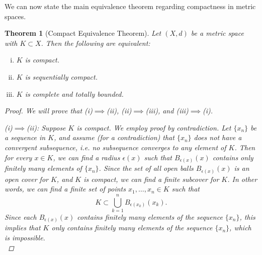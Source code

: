 \documentclass[12pt]{amsart}         %
\newtheorem{theorem}{Theorem}[section]
\theoremstyle{remark}
\begin{document}
We can now state the main equivalence theorem regarding compactness in metric spaces.

\begin{theorem}[Compact Equivalence Theorem]
Let $(X,d)$ be a metric space with $K \subset X$. Then the following are equivalent:
\begin{enumerate}[(i)]
\item $K$ is compact.
\item $K$ is sequentially compact.
\item $K$ is complete and totally bounded.
\end{enumerate}

\begin{proof} We will prove that (i)$\implies$(ii), (ii)$\implies$(iii), and (iii)$\implies$(i).

(i)$\implies$(ii): Suppose $K$ is compact. We employ proof by contradiction. Let $\{x_n\}$ be a sequence in $K$, and assume (for a contradiction) that $\{x_n\}$ does not have a convergent subsequence, i.e. no subsequence converges to any element of $K$. Then for every $x \in K$, we can find a radius $\epsilon(x)$ such that $B_{\epsilon(x)}(x)$ contains only finitely many elements of $\{x_n\}$. Since the set of all open balls $B_{\epsilon(x)}(x)$ is an open cover for $K$, and $K$ is compact, we can find a finite subcover for $K$. In other words, we can find a finite set of points $x_1, \dots, x_n \in K$ such that 
\[
K \subset \bigcup_{k=1}^n B_{\epsilon(x_k)}(x_k).
\]
Since each $B_{\epsilon(x)}(x)$ contains finitely many elements of the sequence $\{x_n\}$, this implies that $K$ only contains finitely many elements of the sequence $\{x_n\}$, which is impossible.\\


\end{proof}
\end{theorem}
\end{document}
